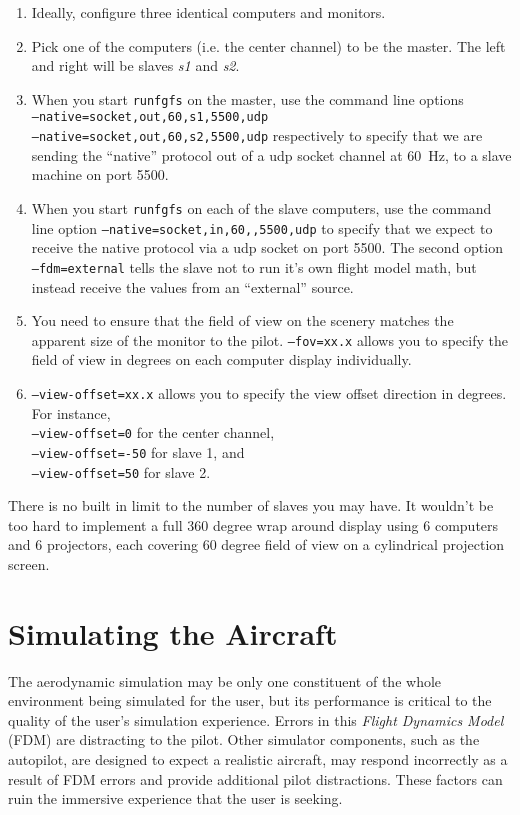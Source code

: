 \documentclass[a4paper,10pt]{article}
\begin{document}
\begin{enumerate}
%
\item Ideally, configure three identical computers and monitors.
%
\item Pick one of the computers (i.e. the center channel) to be the
master.  The left and right will be slaves \textsl{s1} and \textsl{s2}.
%
\item When you start \texttt{runfgfs} on the master,
use the command line options \\
\texttt{--native=socket,out,60,s1,5500,udp} \\
\texttt{--native=socket,out,60,s2,5500,udp}
respectively to specify
that we are sending the ``native'' protocol out of a udp socket channel
at 60~Hz, to a slave machine on port 5500.
%
\item When you start \texttt{runfgfs} on each of the slave computers, 
use the command line
option \texttt{--native=socket,in,60,,5500,udp} to
specify that we expect to receive the native protocol via a udp
socket on port 5500.  The second option
\texttt{--fdm=external} tells the slave not to run
it's own flight model math, but instead receive the values from an
``external'' source.
%
\item You need to ensure that the field of view on the scenery
matches the apparent size of the monitor to the pilot.
\texttt{--fov=xx.x} allows you to specify the field of view in degrees
on each computer display individually.
%
\item \texttt{--view-offset=xx.x} allows you to specify the view offset
direction in degrees.  For instance,\\
\texttt{--view-offset=0} for the center channel,\\
\texttt{--view-offset=-50} for slave 1, and\\
\texttt{--view-offset=50} for slave 2.
%
\end{enumerate}

There is no built in limit to the number of slaves you may have.  It
wouldn't be too hard to implement a full 360 degree wrap around
display using 6 computers and 6 projectors, each covering 60 degree
field of view on a cylindrical projection screen.

%
\section*{Simulating the Aircraft}
%
%
The aerodynamic simulation may be only one constituent of the whole
environment being simulated for the user, but its performance is
critical to the quality of the user's simulation experience.
Errors in this \textsl{Flight Dynamics Model} (FDM) are distracting
to the pilot.
Other simulator components, such as the autopilot,
are designed to expect a realistic
aircraft, may respond incorrectly as a result of FDM errors
and provide additional pilot distractions. These factors
can ruin the immersive experience that the user is seeking.
\end{document}
